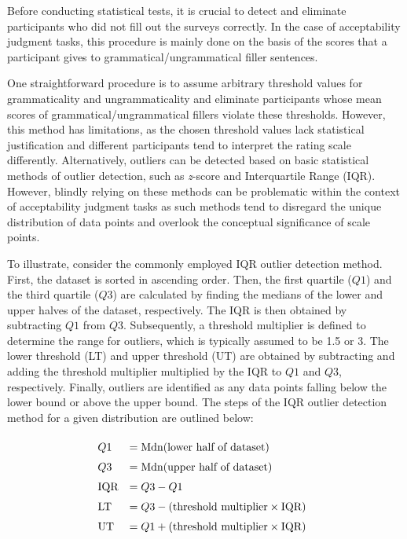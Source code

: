 Before conducting statistical tests, it is crucial to detect and eliminate participants who did not fill out the surveys correctly. In the case of acceptability judgment tasks, this procedure is mainly done on the basis of the scores that a participant gives to grammatical/ungrammatical filler sentences. 

One straightforward procedure is to assume arbitrary threshold values for grammaticality and ungrammaticality and eliminate participants whose mean scores of grammatical/ungrammatical fillers violate these thresholds. However, this method has limitations, as the chosen threshold values lack statistical justification and different participants tend to interpret the rating scale differently. Alternatively, outliers can be detected based on basic statistical methods of outlier detection, such as \textit{z}-score and Interquartile Range (IQR). However, blindly relying on these methods can be problematic within the context of acceptability judgment tasks as such methods tend to disregard the unique distribution of data points and overlook the conceptual significance of scale points.

To illustrate, consider the commonly employed IQR outlier detection method. First, the dataset is sorted in ascending order. Then, the first quartile ($Q1$) and the third quartile ($Q3$) are calculated by finding the medians of the lower and upper halves of the dataset, respectively. The IQR is then obtained by subtracting $Q1$ from $Q3$. Subsequently, a threshold multiplier is defined to determine the range for outliers, which is typically assumed to be 1.5 or 3. The lower threshold (LT) and upper threshold (UT) are obtained by subtracting and adding the threshold multiplier multiplied by the IQR to $Q1$ and $Q3$, respectively. Finally, outliers are identified as any data points falling below the lower bound or above the upper bound. The steps of the IQR outlier detection method for a given distribution are outlined below:

\pex
\vspace{-1.4em}
\begin{equation*}
	\renewcommand\arraystretch{1.5}
	\begin{array}{@{}ll}
		Q1 & = \text{Mdn}(\text{lower half of dataset}) \\
		Q3 & = \text{Mdn}(\text{upper half of dataset}) \\
		\text{IQR} & = Q3 - Q1 \\
		\text{LT}  & = Q3 - (\text{threshold multiplier} \times \text{IQR}) \\
		\text{UT} & = Q1 + (\text{threshold multiplier} \times \text{IQR}) \\
	\end{array}
\end{equation*}
\xe

